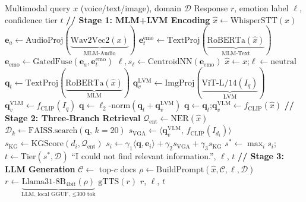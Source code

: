 \documentclass[10pt,conference]{IEEEtran}
\theoremstyle{ieeethm}
\theoremstyle{ieeedef}
\theoremstyle{ieeeremark}
\begin{document}
\begin{algorithm}[!t]
\caption{MIVA-KNIGHT$^+$ Inference (LLM+VLM+LVM+MLM)}
\label{alg:full_pipeline}
\begin{algorithmic}[1]
\Require Multimodal query $x$ (voice/text/image), domain $\mathcal{D}$
\Ensure Response $r$, emotion label $\ell$, confidence tier $t$
\Statex \textbf{// Stage 1: MLM+LVM Encoding}
  \State $\hat{x} \gets \text{WhisperSTT}(x)$ 
  \State $\mathbf{e}_a \gets \text{AudioProj}(\underbrace{\text{Wav2Vec2}(x)}_{\text{MLM-Audio}})$
  \State $\mathbf{e}_t^\text{emo} \gets \text{TextProj}(\underbrace{\text{RoBERTa}(\hat{x})}_{\text{MLM-Text}})$
  \State $\mathbf{e}_\text{emo} \gets \text{GatedFuse}(\mathbf{e}_a, \mathbf{e}_t^\text{emo})$ 
  \State $\ell, s_\ell \gets \text{CentroidNN}(\mathbf{e}_\text{emo})$
\Else
  \State $\hat{x} \gets x$;\quad $\ell \gets \text{neutral}$
\EndIf
\State $\mathbf{q}_t \gets \text{TextProj}(\underbrace{\text{RoBERTa}(\hat{x})}_{\text{MLM}})$
  \State $\mathbf{q}_v^\text{LVM} \gets \text{ImgProj}(\underbrace{\text{ViT-L/14}(I_q)}_{\text{LVM}})$
  \State $\mathbf{q}_v^\text{VLM} \gets f_\text{CLIP}(I_q)$ 
  \State $\mathbf{q} \gets \ell_2\text{-norm}(\mathbf{q}_t + \mathbf{q}_v^\text{LVM})$
\Else
  \State $\mathbf{q} \gets \mathbf{q}_t$;\quad $\mathbf{q}_v^\text{VLM} \gets f_\text{CLIP}(\hat{x})$
\EndIf
\Statex \textbf{// Stage 2: Three-Branch Retrieval}
\State $\mathcal{Q}_\text{ent} \gets \text{NER}(\hat{x})$ 
\State $\mathcal{D}_k \gets \text{FAISS.search}(\mathbf{q},\, k{=}20)$
  \State $s_\text{VGA} \gets \langle\mathbf{q}_v^\text{VLM},\, f_\text{CLIP}(I_{d_i})\rangle$ 
  \State $s_\text{KG} \gets \text{KGScore}(d_i, \mathcal{Q}_\text{ent})$
  \State $s_i \gets \gamma_1\langle\mathbf{q},\mathbf{e}_i\rangle + \gamma_2 s_\text{VGA} + \gamma_3 s_\text{KG}$
\EndFor
\State $s^* \gets \max_i s_i$;\quad $t \gets \text{Tier}(s^*, \mathcal{D})$
  \State \Return ``I could not find relevant information.'', $\ell$, $t$
\EndIf
\Statex \textbf{// Stage 3: LLM Generation}
\State $\mathcal{C} \gets$ top-$c$ docs 
\State $\rho \gets \text{BuildPrompt}(\hat{x}, \mathcal{C}, \ell, \mathcal{D})$ 
\State $r \gets \underbrace{\text{Llama31-8B}_\text{4bit}(\rho)}_{\text{LLM, local GGUF, $\leq$300 tok}}$
\State $\text{gTTS}(r)$ 
\State \Return $r$, $\ell$, $t$
\end{algorithmic}
\end{algorithm}
\end{document}
